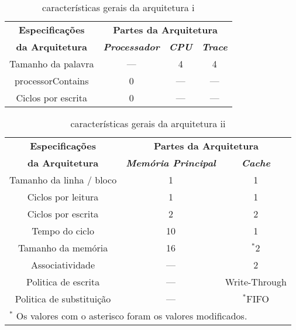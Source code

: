 \documentclass[conference]{IEEEtran}
\begin{document}
\begin{table}[H]
  \caption{características gerais da arquitetura i}
  \begin{center}
      \begin{tabular}{|c|c|c|c|}
          \hline
          \textbf{Especificações} & \multicolumn{3}{|c|}{\textbf{Partes da Arquitetura}} \\
          \cline{2-4} 
          \textbf{da Arquitetura} & \textbf{\textit{Processador}}& \textbf{\textit{CPU}}& \textbf{\textit{Trace}} \\
          \hline
          Tamanho da palavra & --- & 4 & 4 \\
          \hline
          processorContains & 0 & --- & --- \\
          \hline
          Ciclos por escrita & 0 & --- & --- \\
          \hline
      \end{tabular}
      \label{tab1}
  \end{center}
\end{table}

\begin{table}[H]
  \caption{características gerais da arquitetura ii}
  \begin{center}
      \begin{tabular}{|c|c|c|}
          \hline
          \textbf{Especificações} & \multicolumn{2}{|c|}{\textbf{Partes da Arquitetura}} \\
          \cline{2-3} 
          \textbf{da Arquitetura} & \textbf{\textit{Memória Principal}}& \textbf{\textit{Cache}} \\
          \hline
          Tamanho da linha / bloco & 1 & 1  \\
          \hline
          Ciclos por leitura & 1 & 1  \\
          \hline
          Ciclos por escrita & 2 & 2  \\
          \hline
          Tempo do ciclo & 10 & 1  \\
          \hline
          Tamanho da memória & 16 & {$^{\mathrm{*}}$}2  \\
          \hline
          Associatividade & --- & 2  \\
          \hline
          Politica de escrita & --- & Write-Through  \\
          \hline
          Politica de substituição & --- & {$^{\mathrm{*}}$}FIFO  \\
          \hline
          \multicolumn{3}{l}{$^{\mathrm{*}}$ Os valores com o asterisco foram os valores modificados.}
      \end{tabular}
      \label{tab1}
  \end{center}
\end{table}
\end{document}
